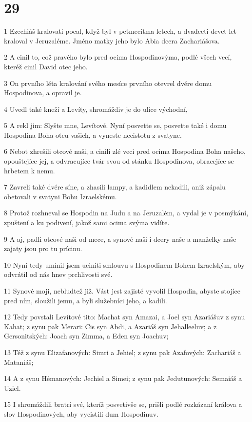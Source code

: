 \chapter{29}

\par 1 Ezechiáš kralovati pocal, když byl v petmecítma letech, a dvadceti devet let kraloval v Jeruzaléme. Jméno matky jeho bylo Abia dcera Zachariášova.
\par 2 A cinil to, což pravého bylo pred ocima Hospodinovýma, podlé všech vecí, kteréž cinil David otec jeho.
\par 3 On prvního léta kralování svého mesíce prvního otevrel dvére domu Hospodinova, a opravil je.
\par 4 Uvedl také kneží a Levíty, shromáždiv je do ulice východní,
\par 5 A rekl jim: Slyšte mne, Levítové. Nyní posvette se, posvette také i domu Hospodina Boha otcu vašich, a vyneste necistotu z svatyne.
\par 6 Nebot zhrešili otcové naši, a cinili zlé veci pred ocima Hospodina Boha našeho, opouštejíce jej, a odvracujíce tvár svou od stánku Hospodinova, obracejíce se hrbetem k nemu.
\par 7 Zavreli také dvére síne, a zhasili lampy, a kadidlem nekadili, aniž zápalu obetovali v svatyni Bohu Izraelskému.
\par 8 Protož rozhneval se Hospodin na Judu a na Jeruzalém, a vydal je v posmýkání, zpuštení a ku podivení, jakož sami ocima svýma vidíte.
\par 9 A aj, padli otcové naši od mece, a synové naši i dcery naše a manželky naše zajaty jsou pro tu prícinu.
\par 10 Nyní tedy umínil jsem uciniti smlouvu s Hospodinem Bohem Izraelským, aby odvrátil od nás hnev prchlivosti své.
\par 11 Synové moji, nebludtež již. Vást jest zajisté vyvolil Hospodin, abyste stojíce pred ním, sloužili jemu, a byli služebníci jeho, a kadili.
\par 12 Tedy povstali Levítové tito: Machat syn Amazai, a Joel syn Azariášuv z synu Kahat; z synu pak Merari: Cis syn Abdi, a Azariáš syn Jehalleeluv; a z Gersonitských: Joach syn Zimma, a Eden syn Joachuv;
\par 13 Též z synu Elizafanových: Simri a Jehiel; z synu pak Azafových: Zachariáš a Mataniáš;
\par 14 A z synu Hémanových: Jechiel a Simei; z synu pak Jedutunových: Semaiáš a Uziel.
\par 15 I shromáždili bratrí své, kteríž posvetivše se, prišli podlé rozkázaní králova a slov Hospodinových, aby vycistili dum Hospodinuv.
